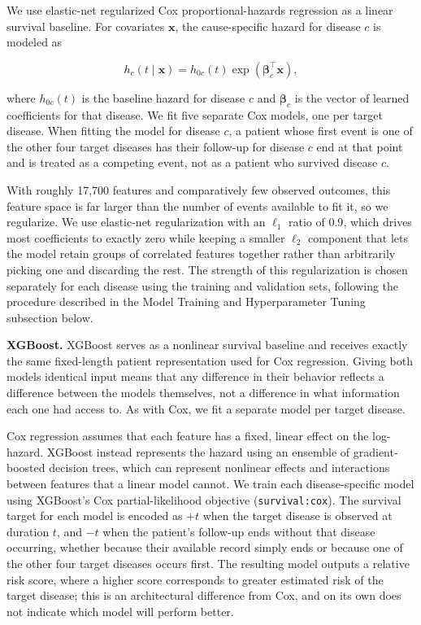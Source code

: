We use elastic-net regularized Cox proportional-hazards regression as a linear survival baseline. For covariates $\mathbf{x}$, the cause-specific hazard for disease $c$ is modeled as

\[
h_c(t \mid \mathbf{x}) = h_{0c}(t)\exp(\boldsymbol{\beta}_c^\top\mathbf{x}),
\]

where $h_{0c}(t)$ is the baseline hazard for disease $c$ and $\boldsymbol{\beta}_c$ is the vector of learned coefficients for that disease. We fit five separate Cox models, one per target disease. When fitting the model for disease $c$, a patient whose first event is one of the other four target diseases has their follow-up for disease $c$ end at that point and is treated as a competing event, not as a patient who survived disease $c$.

With roughly 17{,}700 features and comparatively few observed outcomes, this feature space is far larger than the number of events available to fit it, so we regularize. We use elastic-net regularization with an $\ell_1$ ratio of $0.9$, which drives most coefficients to exactly zero while keeping a smaller $\ell_2$ component that lets the model retain groups of correlated features together rather than arbitrarily picking one and discarding the rest. The strength of this regularization is chosen separately for each disease using the training and validation sets, following the procedure described in the Model Training and Hyperparameter Tuning subsection below.

\textbf{XGBoost.}
XGBoost serves as a nonlinear survival baseline and receives exactly the same fixed-length patient representation used for Cox regression. Giving both models identical input means that any difference in their behavior reflects a difference between the models themselves, not a difference in what information each one had access to. As with Cox, we fit a separate model per target disease.

Cox regression assumes that each feature has a fixed, linear effect on the log-hazard. XGBoost instead represents the hazard using an ensemble of gradient-boosted decision trees, which can represent nonlinear effects and interactions between features that a linear model cannot. We train each disease-specific model using XGBoost's Cox partial-likelihood objective (\texttt{survival:cox}). The survival target for each model is encoded as $+t$ when the target disease is observed at duration $t$, and $-t$ when the patient's follow-up ends without that disease occurring, whether because their available record simply ends or because one of the other four target diseases occurs first. The resulting model outputs a relative risk score, where a higher score corresponds to greater estimated risk of the target disease; this is an architectural difference from Cox, and on its own does not indicate which model will perform better.

